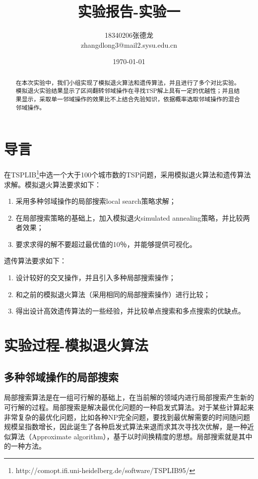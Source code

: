 \documentclass[withoutpreface,bwprint]{cumcmthesis} %
\title{实验报告-实验一}
\author{18340206张德龙 \\
	zhangdlong3@mail2.sysu.edu.cn
}
\date{\today}
\begin{document}
\maketitle
\begin{abstract}
 
 在本次实验中，我们小组实现了模拟退火算法和遗传算法，并且进行了多个对比实验。模拟退火实验结果显示了区间翻转邻域操作在寻找TSP解上具有一定的优越性；并且结果显示，采取单一邻域操作的效果比不上结合先验知识，依据概率选取邻域操作的混合邻域操作。 %
\end{abstract}

\section{导言}

在TSPLIB\footnote{http://comopt.ifi.uni-heidelberg.de/software/TSPLIB95/}中选一个大于100个城市数的TSP问题，采用模拟退火算法和遗传算法求解。模拟退火算法要求如下：
\begin{enumerate}
\item 采用多种邻域操作的局部搜索local search策略求解；
\item 在局部搜索策略的基础上，加入模拟退火simulated annealing策略，并比较两者效果；
\item 要求求得的解不要超过最优值的10％，并能够提供可视化。
\end{enumerate}


遗传算法要求如下：
\begin{enumerate}
\item 设计较好的交叉操作，并且引入多种局部搜索操作；
\item 和之前的模拟退火算法（采用相同的局部搜索操作）进行比较；
\item 得出设计高效遗传算法的一些经验，并比较单点搜索和多点搜索的优缺点。
\end{enumerate}
	

\section{实验过程-模拟退火算法}

\subsection{多种邻域操作的局部搜索}
局部搜索算法是在一组可行解的基础上，在当前解的领域内进行局部搜索产生新的可行解的过程。局部搜索是解决最优化问题的一种启发式算法。对于某些计算起来非常复杂的最优化问题，比如各种NP完全问题，要找到最优解需要的时间随问题规模呈指数增长，因此诞生了各种启发式算法来退而求其次寻找次优解，是一种近似算法（Approximate  algorithm），基于以时间换精度的思想。局部搜索就是其中的一种方法。
\end{document}

